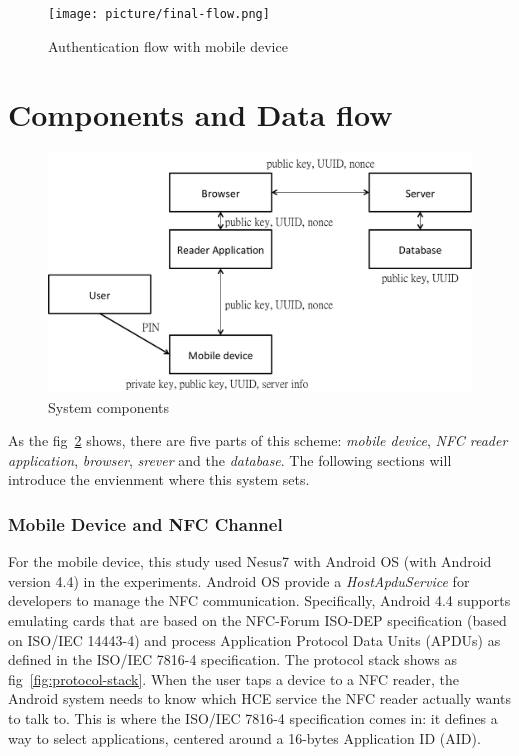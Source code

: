 \begin{CJK}{Bg5}{bsmi}
\begin{figure}
\centering
\texttt{[image: picture/final-flow.png]}
\caption{Authentication flow with mobile device}
\label{fig:final-flow}
\end{figure}

\section{Components and Data flow}

\begin{figure}
\centering
\includegraphics[scale=0.45]{picture/system-component.png}
\caption{System components}
\label{fig:system-component}
\end{figure}

As the fig~\ref{fig:system-component} shows, there are five parts of this scheme: \emph{mobile device}, \emph{NFC reader application}, \emph{browser}, \emph{srever} and the \emph{database}. The following sections will introduce the envienment where this system sets.

\subsubsection{Mobile Device and NFC Channel}

For the mobile device, this study used Nesus7 with Android OS (with Android version 4.4) in the experiments. Android OS provide a \emph{HostApduService} for developers to manage the NFC communication. Specifically, Android 4.4 supports emulating cards that are based on the NFC-Forum ISO-DEP specification (based on ISO/IEC 14443-4) and process Application Protocol Data Units (APDUs) as defined in the ISO/IEC 7816-4 specification. The protocol stack shows as fig~\ref{fig:protocol-stack}. When the user taps a device to a NFC reader, the Android system needs to know which HCE service the NFC reader actually wants to talk to. This is where the ISO/IEC 7816-4 specification comes in: it defines a way to select applications, centered around a 16-bytes Application ID (AID).


\end{CJK}
